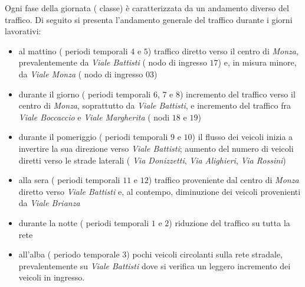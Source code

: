 Ogni fase della giornata (\ie{} classe) è caratterizzata da un andamento diverso del traffico. Di seguito si presenta l'andamento generale del traffico durante i giorni lavorativi:
\begin{itemize}
	\item al mattino (\ie{} periodi temporali $4$ e $5$) traffico diretto verso il centro di \emph{Monza}, prevalentemente da \emph{Viale Battisti} (\ie{} nodo di ingresso $17$) e, in misura minore, da \emph{Viale Monza} (\ie{} nodo di ingresso $03$)
	\item durante il giorno (\ie{} periodi temporali $6$, $7$ e $8$) incremento del traffico verso il centro di \emph{Monza}, soprattutto da \emph{Viale Battisti}, e incremento del traffico fra \emph{Viale Boccaccio} e \emph{Viale Margherita} (\ie{} nodi $18$ e $19$)
	\item durante il pomeriggio (\ie{} periodi temporali $9$ e $10$) il flusso dei veicoli inizia a invertire la sua direzione verso \emph{Viale Battisti}; aumento del numero di veicoli diretti verso le strade laterali (\eg{} \emph{Via Donizzetti}, \emph{Via Alighieri}, \emph{Via Rossini})
	\item alla sera (\ie{} periodi temporali $11$ e $12$) traffico proveniente dal centro di \emph{Monza} diretto verso \emph{Viale Battisti} e, al contempo, diminuzione dei veicoli provenienti da \emph{Viale Brianza}
	\item durante la notte (\ie{} periodi temporali $1$ e $2$) riduzione del traffico su tutta la rete
	\item all'alba (\ie{} periodo temporale $3$) pochi veicoli circolanti sulla rete stradale, prevalentemente su \emph{Viale Battisti} dove si verifica un leggero incremento dei veicoli in ingresso.
\end{itemize}

